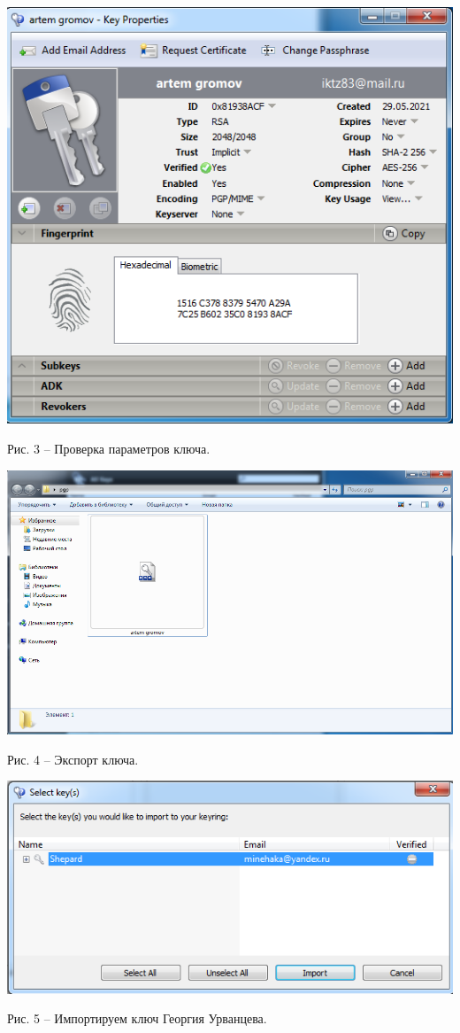 \documentclass[a4paper,14pt]{extarticle}
\begin{document}
    \begin{center}
        \includegraphics[scale=0.6]{pics/3.png}

        Рис. 3 – Проверка параметров ключа.
    \end{center}
    \begin{center}
        \includegraphics[scale=0.4]{pics/4.png}

        Рис. 4 – Экспорт ключа.
    \end{center}
    \begin{center}
        \includegraphics[scale=0.6]{pics/5.png}
        
        Рис. 5 – Импортируем ключ Георгия Урванцева.
    \end{center}
\end{document}

